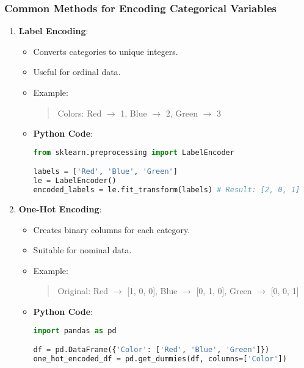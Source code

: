 \documentclass[aspectratio=169]{beamer}
\begin{document}
\begin{frame}
    \frametitle{Common Methods for Encoding Categorical Variables}
    \begin{enumerate}
        \item \textbf{Label Encoding}:
            \begin{itemize}
                \item Converts categories to unique integers.
                \item Useful for ordinal data.
                \item Example: 
                \begin{quote}
                    Colors: Red $\rightarrow$ 1, Blue $\rightarrow$ 2, Green $\rightarrow$ 3 
                \end{quote}
                \item \textbf{Python Code}:
                    \begin{lstlisting}[language=Python]
from sklearn.preprocessing import LabelEncoder

labels = ['Red', 'Blue', 'Green']
le = LabelEncoder()
encoded_labels = le.fit_transform(labels) # Result: [2, 0, 1]
                    \end{lstlisting}
            \end{itemize}

        \item \textbf{One-Hot Encoding}:
            \begin{itemize}
                \item Creates binary columns for each category.
                \item Suitable for nominal data.
                \item Example:
                \begin{quote}
                    Original: Red $\rightarrow$ [1, 0, 0], Blue $\rightarrow$ [0, 1, 0], Green $\rightarrow$ [0, 0, 1]
                \end{quote}
                \item \textbf{Python Code}:
                    \begin{lstlisting}[language=Python]
import pandas as pd

df = pd.DataFrame({'Color': ['Red', 'Blue', 'Green']})
one_hot_encoded_df = pd.get_dummies(df, columns=['Color'])
                    \end{lstlisting}
            \end{itemize}
    \end{enumerate}
\end{frame}
\end{document}
